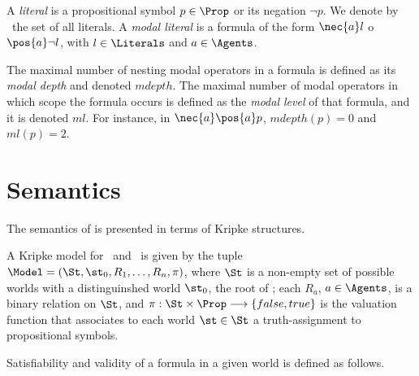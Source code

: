 A \emph{literal} is a propositional symbol $p \in \Prop$ or its negation $\neg p$. We denote by \Literals~the set of all literals. A \emph{modal literal} is a formula of the form $\nec{a} l$ o $\pos{a} \neg l$, with $l \in \Literals$ and $a \in \Agents$.



The maximal number of nesting modal operators in a formula is defined as its \emph{modal depth} and denoted $mdepth$. The maximal number of modal operators in which scope the formula occurs is defined as the \emph{modal level} of that formula, and it is denoted $ml$. For instance, in $\nec{a}\pos{a} p$, $mdepth(p) = 0$ and $ml(p) = 2$.

\section{Semantics}
The semantics of  is presented in terms of Kripke structures.

\begin{definition}
    A Kripke model for \Prop~and \Agents~is given by the tuple $\Model = (\St, \st_0, R_1, \ldots, R_n, \pi)$,
    where $\St$ is a non-empty set of possible worlds with a distinguinshed world
    $\st_0$, the root of \Model; each $R_a$, $a \in \Agents$, is a binary relation
    on $\St$, and $\pi: \St \times \Prop \longrightarrow \{false, true\}$ is the
    valuation function that associates to each world $\st \in \St$ a
    truth-assignment to propositional symbols.
\end{definition}

Satisfiability and validity of a formula in a given world is defined as follows.


